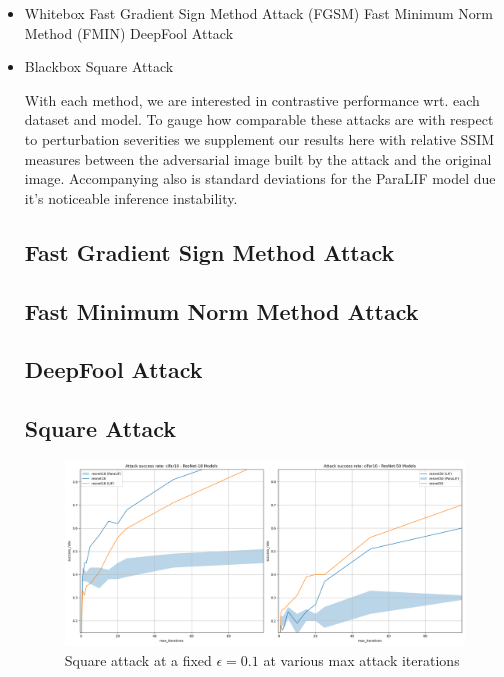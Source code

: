 \documentclass[conference]{IEEEtran}
\begin{document}
\begin{itemize}
    \item Whitebox
        \subitem Fast Gradient Sign Method Attack (FGSM)
        \subitem Fast Minimum Norm Method (FMIN)
        \subitem DeepFool Attack

    \item Blackbox
        \subitem Square Attack

With each method, we are interested in contrastive performance wrt. each dataset and model. To gauge how comparable these attacks are with respect to perturbation severities we supplement our results here with relative SSIM measures between the adversarial image built by the attack and the original image. Accompanying also is standard deviations for the ParaLIF model due it's noticeable inference instability.

\subsection*{Fast Gradient Sign Method Attack}
\subsection*{Fast Minimum Norm Method Attack}
\subsection*{DeepFool Attack}
\subsection*{Square Attack}
\begin{figure}[h!]
    \centering
    \includegraphics[width=\linewidth]{square-cifar10.png}
    \caption{Square attack at a fixed $\epsilon=0.1$ at various max attack iterations}
    \label{fig:square_attack}
\end{figure}


\end{itemize}
\end{document}
